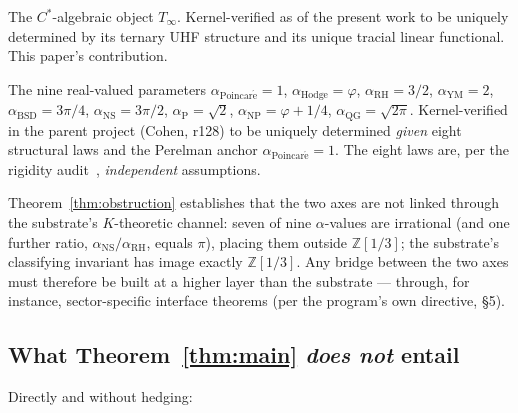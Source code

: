 \documentclass[11pt,a4paper]{article}
\theoremstyle{plain}
\theoremstyle{definition}
\begin{document}
\begin{description}[leftmargin=2em]
  \item[Axis 1 --- the substrate.] The $C^{\ast}$-algebraic object $T_{\infty}$. Kernel-verified as of the present work to be uniquely determined by its ternary UHF structure and its unique tracial linear functional. This paper's contribution.
  \item[Axis 2 --- the $\alpha$-skeleton.] The nine real-valued parameters $\alpha_{\mathrm{Poincar\acute{e}}} = 1$, $\alpha_{\mathrm{Hodge}} = \varphi$, $\alpha_{\mathrm{RH}} = 3/2$, $\alpha_{\mathrm{YM}} = 2$, $\alpha_{\mathrm{BSD}} = 3\pi/4$, $\alpha_{\mathrm{NS}} = 3\pi/2$, $\alpha_{\mathrm{P}} = \sqrt{2}$, $\alpha_{\mathrm{NP}} = \varphi + 1/4$, $\alpha_{\mathrm{QG}} = \sqrt{2\pi}$. Kernel-verified in the parent project (Cohen, r128) to be uniquely determined \emph{given} eight structural laws and the Perelman anchor $\alpha_{\mathrm{Poincar\acute{e}}} = 1$. The eight laws are, per the rigidity audit~\cite{cohen_alpha_rigidity_2026}, \emph{independent} assumptions.
\end{description}

Theorem~\ref{thm:obstruction} establishes that the two axes are not linked through the substrate's $K$-theoretic channel: seven of nine $\alpha$-values are irrational (and one further ratio, $\alpha_{\mathrm{NS}}/\alpha_{\mathrm{RH}}$, equals $\pi$), placing them outside $\mathbb{Z}[1/3]$; the substrate's classifying invariant has image exactly $\mathbb{Z}[1/3]$. Any bridge between the two axes must therefore be built at a higher layer than the substrate --- through, for instance, sector-specific interface theorems (per the program's own directive, \S 5).

\subsection*{What Theorem~\ref{thm:main} \emph{does not} entail}

Directly and without hedging:
\end{document}
